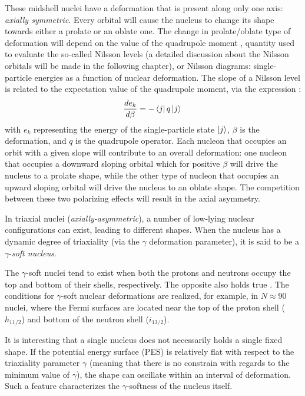 These midshell nuclei have a deformation that is present along only one axis: \emph{axially symmetric}. Every orbital will cause the nucleus to change its shape towards either a prolate or an oblate one. The change in prolate/oblate type of deformation will depend on the value of the quadrupole moment \cite{lewis2019lifetime}, quantity used to evaluate the so-called Nilsson levels \cite{ragnarsson2005shapes} (a detailed discussion about the Nilsson orbitals will be made in the following chapter), or Nilsson diagrams: single-particle energies as a function of nuclear deformation. The slope of a Nilsson level is related to the expectation value of the quadrupole moment, via the expression \cite{andersson1976nuclear}:
\begin{align}
    \frac{d e_k}{d\beta}=-\bra{j}q\ket{j}\, 
\end{align}
with $e_k$ representing the energy of the single-particle state $\ket{j}$, $\beta$ is the deformation, and $q$ is the quadrupole operator. Each nucleon that occupies an orbit with a given slope will contribute to an overall deformation: one nucleon that occupies a downward sloping orbital which for positive $\beta$ will drive the nucleus to a prolate shape, while the other type of nucleon that occupies an upward sloping orbital will drive the nucleus to an oblate shape. The competition between these two polarizing effects will result in the axial asymmetry.

In triaxial nuclei (\emph{axially-asymmetric}), a number of low-lying nuclear configurations can exist, leading to different shapes. When the nucleus has a dynamic degree of triaxiality (via the $\gamma$ deformation parameter), it is said to be a $\gamma$-\emph{soft nucleus}. 

The $\gamma$-soft nuclei tend to exist when both the protons and neutrons occupy the top and bottom of their shells, respectively. The opposite also holds true \cite{chen2014collective}. The conditions for $\gamma$-soft nuclear deformations are realized, for example, in $N \approx 90$ nuclei, where the Fermi surfaces are located near the top of the proton shell ($h_{11/2}$) and bottom of the neutron shell ($i_{13/2}$).

It is interesting that a single nucleus does not necessarily holds a single fixed shape. If the potential energy surface (PES) is relatively flat with respect to the triaxiality parameter $\gamma$ (meaning that there is no constrain with regards to the minimum value of $\gamma$), the shape can oscillate within an interval of deformation. Such a feature characterizes the $\gamma$-softness of the nucleus itself.